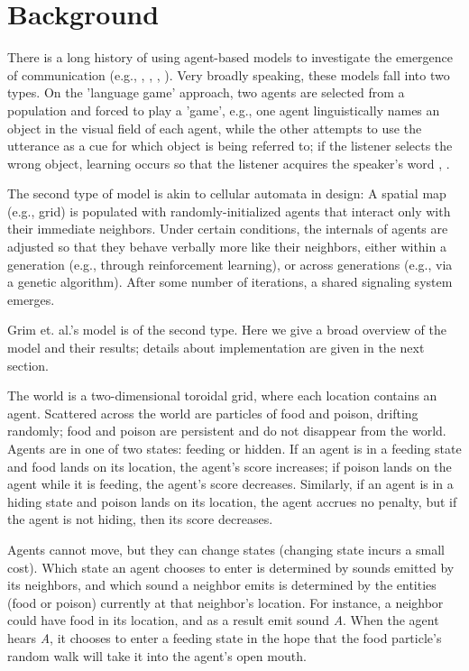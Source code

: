 \section{Background} \label{background}

There is a long history of using agent-based models to investigate the emergence of communication 
(e.g., \cite{goody_how_1995}, \cite{brooks_altruism_1994}, \cite{Steels97synthesisingthe}, \cite{steels_evolving_2003}). Very 
broadly speaking, these models fall into two types. On the 'language game' approach, two agents are selected from a population and 
forced to play a 'game', e.g., one agent linguistically names an object in the visual field of each agent, while the other attempts to use the 
utterance as a cue for which object is being referred to; if the listener selects the wrong object, learning occurs so that the listener 
acquires the speaker's word \cite{Steels2012}, \cite{Baronchelli06bootstrappingcommunication}.

The second type of model is akin to cellular automata in design: A spatial map (e.g., grid) is populated with randomly-initialized agents 
that interact only with their immediate neighbors. Under certain conditions, the internals of agents are adjusted so that they behave verbally 
more like their neighbors, either within a generation (e.g., through reinforcement learning), or across generations (e.g., via a genetic algorithm). 
After some number of iterations, a shared signaling system emerges. 

Grim et. al.'s model is of the second type. Here we give a broad overview of the model and their results; details about implementation are given in the 
next section. 

The world is a two-dimensional toroidal grid, where each location contains an agent. Scattered 
across the world are particles of food and poison, drifting randomly; food and poison are persistent and do not disappear from the world. 
Agents are in one of two states: feeding or hidden. If an agent is in a feeding state and food lands on its location, the agent's score increases; 
if poison lands on the agent while it is feeding, the agent's score decreases. Similarly, if an agent is in a hiding state and poison lands on 
its location, the agent accrues no penalty, but if the agent is not hiding, then its score decreases.

Agents cannot move, but they can change states (changing state incurs a small cost). Which state an agent chooses to enter is determined by sounds emitted by its neighbors, and which sound a neighbor emits is determined by the entities (food or poison) currently at that neighbor's location. For instance, a neighbor could have food in its location, 
and as a result emit sound \textit{A}. When the agent hears \textit{A}, it chooses to enter a feeding state in the hope that the food particle's 
random walk will take it into the agent's open mouth.

